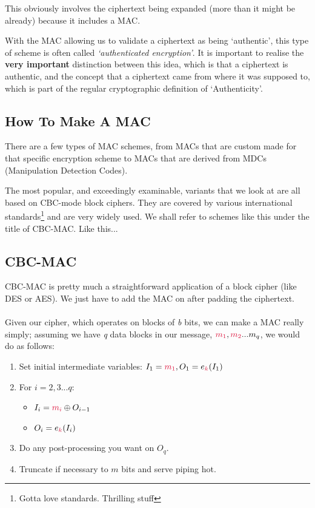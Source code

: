    This obviously involves the ciphertext being expanded (more than it might be already) because it includes a MAC. 

    With the MAC allowing us to validate a ciphertext as being `authentic', this type of scheme is often called \emph{`authenticated encryption'}.
    It is important to realise the \textbf{very important} distinction between this idea, which is that a ciphertext is authentic, and the concept that a ciphertext came from where it was supposed to, which is part of the regular cryptographic definition of `Authenticity'.

    \subsection{How To Make A MAC}
    There are a few types of MAC schemes, from MACs that are custom made for that specific encryption scheme to MACs that are derived from MDCs (Manipulation Detection Codes).

    The most popular, and exceedingly examinable, variants that we look at are all based on CBC-mode block ciphers. They are covered by various international standards\footnote{Gotta love standards. Thrilling stuff} and are very widely used. We shall refer to schemes like this under the title of CBC-MAC. Like this...

    \subsection{CBC-MAC}
    CBC-MAC is pretty much a straightforward application of a block cipher (like DES or AES). We just have to add the MAC on after padding the ciphertext.\\
    \\
    Given our cipher, which operates on blocks of \emph{b} bits, we can make a MAC really simply; assuming we have \emph{q} data blocks in our message, $\csubm{1}, \csubm{2}...m_{q}$, we would do as follows:\\

    \begin{enumerate}
        \item Set initial intermediate variables: $I_{1} = \csubm{1}, O_{1} = e_{\ck}(I_{1})$
        \item For $i = 2, 3 ... q$:
            \begin{itemize}
                \item $I_{i} = \csubm{i} \oplus O_{i - 1}$
                \item $O_{i} = e_{\ck}(I_{i})$
            \end{itemize}
        \item Do any post-processing you want on $O_{q}$.
        \item Truncate if necessary to $m$ bits and serve piping hot.
    \end{enumerate}

